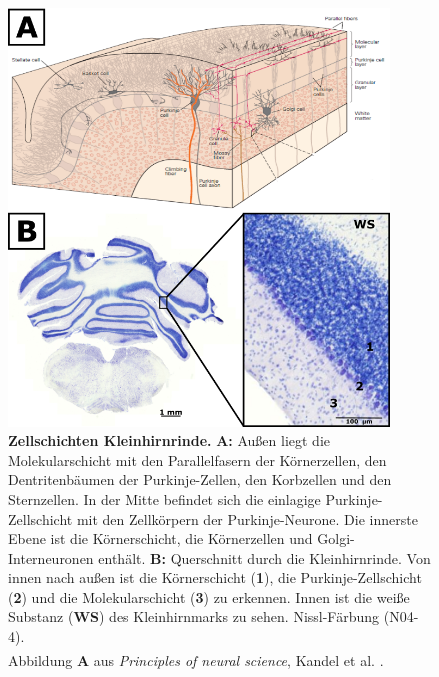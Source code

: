 \documentclass[12pt,a4paper,pdftex]{article}
\begin{document}
\begin{figure}[H]
    \centering
    \includegraphics[width=0.9\textwidth]{pictures/Bilder_Laura/kleinhirn_schichten2.png}
    \caption[Zellschichten Kleinhirnrinde]{\textbf{Zellschichten Kleinhirnrinde.} \textbf{A:} Außen liegt die Molekularschicht mit den Parallelfasern der Körnerzellen, den Dentritenbäumen der Purkinje-Zellen, den Korbzellen und den Sternzellen. In der Mitte befindet sich die einlagige Purkinje-Zellschicht mit den Zellkörpern der Purkinje-Neurone. Die innerste Ebene ist die Körnerschicht, die Körnerzellen und Golgi-Interneuronen enthält. \textbf{B:} Querschnitt durch die Kleinhirnrinde. Von innen nach außen ist die Körnerschicht (\textbf{1}), die Purkinje-Zellschicht (\textbf{2}) und die Molekularschicht (\textbf{3}) zu erkennen. Innen ist die weiße Substanz (\textbf{WS}) des Kleinhirnmarks zu sehen. Nissl-Färbung (N04-4). \\ Abbildung \textbf{A} aus \textit{Principles of neural science}, Kandel et al. \textsuperscript{\cite[42]{kandel2013principles}}.}
    \label{fig:schichten_kleinhirn}
\end{figure}
\end{document}

